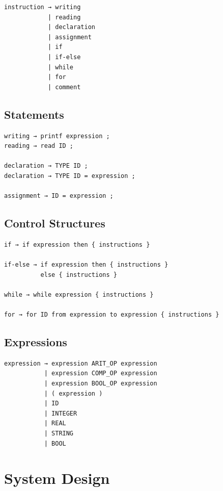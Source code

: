 \documentclass[letterpaper,12pt,oneside]{article}
\begin{document}
\begin{lstlisting}
instruction → writing
            | reading
            | declaration
            | assignment
            | if
            | if-else
            | while
            | for
            | comment
\end{lstlisting}

\subsection{Statements}

\begin{lstlisting}
writing → printf expression ;
reading → read ID ;

declaration → TYPE ID ;
declaration → TYPE ID = expression ;

assignment → ID = expression ;
\end{lstlisting}

\subsection{Control Structures}

\begin{lstlisting}
if → if expression then { instructions }

if-else → if expression then { instructions }
          else { instructions }

while → while expression { instructions }

for → for ID from expression to expression { instructions }
\end{lstlisting}

\subsection{Expressions}

\begin{lstlisting}
expression → expression ARIT_OP expression
           | expression COMP_OP expression
           | expression BOOL_OP expression
           | ( expression )
           | ID
           | INTEGER
           | REAL
           | STRING
           | BOOL
\end{lstlisting}


\section{System Design}
\end{document}
